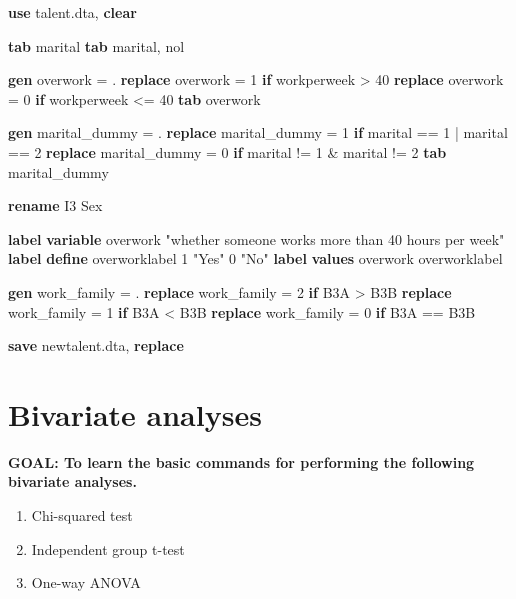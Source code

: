 \documentclass[
]{book}
\newenvironment{Shaded}{\begin{snugshade}}{\end{snugshade}}
\newcommand{\KeywordTok}[1]{\textcolor[rgb]{0.13,0.29,0.53}{\textbf{#1}}}
\newcommand{\NormalTok}[1]{#1}
\newcommand{\StringTok}[1]{\textcolor[rgb]{0.31,0.60,0.02}{#1}}
\providecommand{\tightlist}{%
  \setlength{\itemsep}{0pt}\setlength{\parskip}{0pt}}
\begin{document}
\begin{alert}

\begin{Shaded}
\begin{Highlighting}[]
\KeywordTok{use}\NormalTok{ talent.dta, }\KeywordTok{clear}

\KeywordTok{tab}\NormalTok{ marital}
\KeywordTok{tab}\NormalTok{ marital, nol }

\KeywordTok{gen}\NormalTok{ overwork = .}
\KeywordTok{replace}\NormalTok{ overwork = 1 }\KeywordTok{if}\NormalTok{ workperweek \textgreater{} 40}
\KeywordTok{replace}\NormalTok{ overwork = 0 }\KeywordTok{if}\NormalTok{ workperweek \textless{}= 40}
\KeywordTok{tab}\NormalTok{ overwork}

\KeywordTok{gen}\NormalTok{ marital\_dummy = .}
\KeywordTok{replace}\NormalTok{ marital\_dummy = 1 }\KeywordTok{if}\NormalTok{ marital == 1 | marital == 2}
\KeywordTok{replace}\NormalTok{ marital\_dummy = 0 }\KeywordTok{if}\NormalTok{ marital != 1 \& marital != 2}
\KeywordTok{tab}\NormalTok{ marital\_dummy}

\KeywordTok{rename}\NormalTok{ I3 Sex}

\KeywordTok{label} \KeywordTok{variable}\NormalTok{ overwork }\StringTok{"whether someone works more than 40 hours per week"}
\KeywordTok{label} \KeywordTok{define}\NormalTok{ overworklabel 1 }\StringTok{"Yes"}\NormalTok{ 0 }\StringTok{"No"}
\KeywordTok{label} \KeywordTok{values}\NormalTok{ overwork overworklabel}

\KeywordTok{gen}\NormalTok{ work\_family = .}
\KeywordTok{replace}\NormalTok{ work\_family = 2 }\KeywordTok{if}\NormalTok{ B3A \textgreater{} B3B}
\KeywordTok{replace}\NormalTok{ work\_family = 1 }\KeywordTok{if}\NormalTok{ B3A \textless{} B3B}
\KeywordTok{replace}\NormalTok{ work\_family = 0 }\KeywordTok{if}\NormalTok{ B3A == B3B}

\KeywordTok{save}\NormalTok{ newtalent.dta, }\KeywordTok{replace} 
\end{Highlighting}
\end{Shaded}

\end{alert}

\hypertarget{bivariate-analyses}{%
\section{Bivariate analyses}\label{bivariate-analyses}}

\begin{alert}

\textbf{GOAL: To learn the basic commands for performing the following bivariate analyses.}

\begin{enumerate}
\def\labelenumi{\arabic{enumi}.}
\tightlist
\item
  Chi-squared test
\item
  Independent group t-test
\item
  One-way ANOVA
\end{enumerate}

\end{alert}
\end{document}
